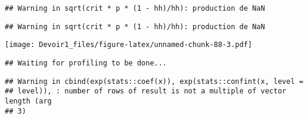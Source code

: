 \documentclass[]{article}
\newenvironment{Shaded}{\begin{snugshade}}{\end{snugshade}}
\newcommand{\KeywordTok}[1]{\textcolor[rgb]{0.13,0.29,0.53}{\textbf{#1}}}
\newcommand{\DataTypeTok}[1]{\textcolor[rgb]{0.13,0.29,0.53}{#1}}
\newcommand{\DecValTok}[1]{\textcolor[rgb]{0.00,0.00,0.81}{#1}}
\newcommand{\StringTok}[1]{\textcolor[rgb]{0.31,0.60,0.02}{#1}}
\newcommand{\OperatorTok}[1]{\textcolor[rgb]{0.81,0.36,0.00}{\textbf{#1}}}
\newcommand{\NormalTok}[1]{#1}
\begin{document}
\begin{verbatim}
## Warning in sqrt(crit * p * (1 - hh)/hh): production de NaN
\end{verbatim}

\begin{verbatim}
## Warning in sqrt(crit * p * (1 - hh)/hh): production de NaN
\end{verbatim}

\texttt{[image: Devoir1\_files/figure-latex/unnamed-chunk-88-3.pdf]}

\begin{Shaded}
\end{Shaded}

\begin{verbatim}
## Waiting for profiling to be done...
\end{verbatim}

\begin{verbatim}
## Warning in cbind(exp(stats::coef(x)), exp(stats::confint(x, level =
## level)), : number of rows of result is not a multiple of vector length (arg
## 3)
\end{verbatim}
\end{document}
